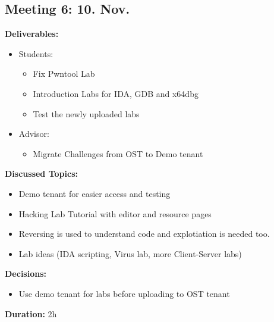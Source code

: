 \subsection*{Meeting 6: 10. Nov.}
\textbf{Deliverables:}
\begin{itemize}
    \item Students:
    \begin{itemize}
        \item Fix Pwntool Lab
        \item Introduction Labs for IDA, GDB and x64dbg
        \item Test the newly uploaded labs
    \end{itemize}
    \item Advisor:
    \begin{itemize}
        \item Migrate Challenges from OST to Demo tenant
    \end{itemize}
\end{itemize} 
\textbf{Discussed Topics:}
\begin{itemize}
    \item Demo tenant for easier access and testing
    \item Hacking Lab Tutorial with editor and resource pages
    \item Reversing is used to understand code and explotiation is needed too.
    \item Lab ideas (IDA scripting, Virus lab, more Client-Server labs)
\end{itemize}
\textbf{Decisions:}
\begin{itemize}
    \item Use demo tenant for labs before uploading to OST tenant    
\end{itemize}
\textbf{Duration:} 2h
